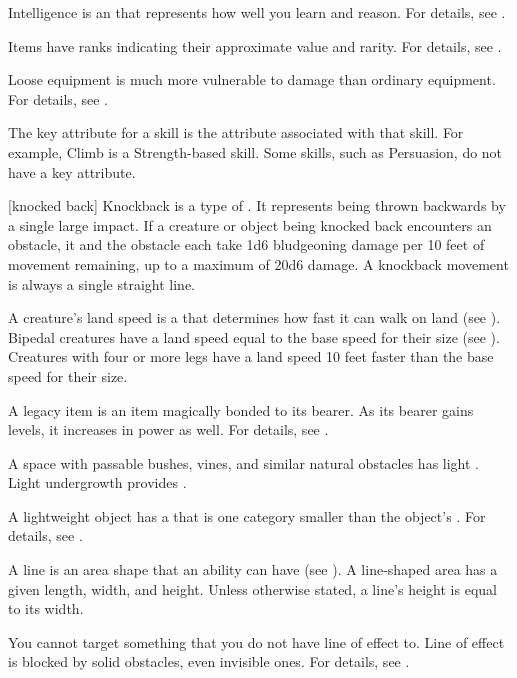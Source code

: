  Intelligence is an  that represents how well you learn and reason.
For details, see .

 Items have ranks indicating their approximate value and rarity.
For details, see .

 Loose equipment is much more vulnerable to damage than ordinary equipment.
For details, see .

 The key attribute for a skill is the attribute associated with that skill.
For example, Climb is a Strength-based skill.
Some skills, such as Persuasion, do not have a key attribute.

[knocked back] Knockback is a type of .
It represents being thrown backwards by a single large impact.
If a creature or object being knocked back encounters an obstacle, it and the obstacle each take 1d6 bludgeoning damage per 10 feet of movement remaining, up to a maximum of 20d6 damage.
A knockback movement is always a single straight line.

 A creature's land speed is a  that determines how fast it can walk on land (see ).
Bipedal creatures have a land speed equal to the base speed for their size (see ).
Creatures with four or more legs have a land speed 10 feet faster than the base speed for their size.

 A legacy item is an item magically bonded to its bearer.
As its bearer gains levels, it increases in power as well.
For details, see .

 A space with passable bushes, vines, and similar natural obstacles has light .
Light undergrowth provides .

 A lightweight object has a  that is one category smaller than the object's .
For details, see .

 A line is an area shape that an ability can have (see ).
A line-shaped area has a given length, width, and height.
Unless otherwise stated, a line's height is equal to its width.

 You cannot target something that you do not have line of effect to.
Line of effect is blocked by solid obstacles, even invisible ones.
For details, see .

